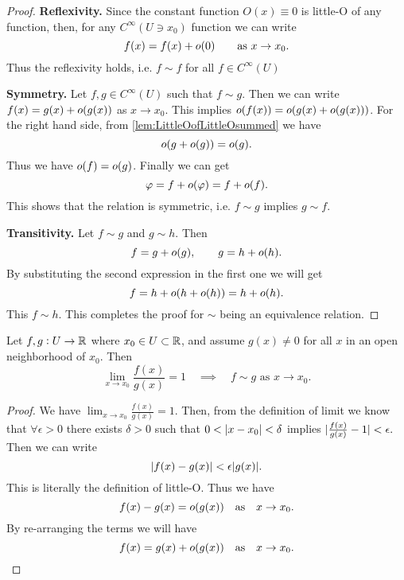 \begin{proof}
	\textbf{Reflexivity.} Since the constant function $ O(x) \equiv 0 $ is little-O of any function, then, for any $ C^\infty(U\ni x_0) $ function we can write
	\[ f(x) = f(x) + o(0) \qquad \text{as } x\to x_0. \]
	Thus the reflexivity holds, i.e. $ f \sim f $ for all $ f \in C^\infty(U) $
	
	\noindent \textbf{Symmetry.} Let $ f,g \in C^\infty(U) $ such that $ f \sim g $. Then we can write $ f(x) = g(x) + o(g(x)) $ as $ x\to x_0 $. This implies $ o(f(x)) = o(g(x) + o(g(x))) $. For the right hand side, from \autoref{lem:LittleOofLittleOsummed} we have
	\[ o(g + o(g)) = o(g). \]
	Thus we have $ o(f)  = o(g)$. Finally we can get
	\[ \varphi = f + o(\varphi) = f + o(f). \]
	This shows that the relation is symmetric, i.e. $ f \sim g $ implies $ g \sim f $.
	
	\noindent \textbf{Transitivity.} Let $ f\sim g $ and $ g \sim h $. Then 
	\[ f = g + o(g), \qquad g = h + o(h). \]
	By substituting the second expression in the first one we will get
	\[ f = h + o(h + o(h)) = h + o(h). \]
	This $ f \sim h $. This completes the proof for $ \sim $ being an equivalence relation.
\end{proof}

\begin{proposition}
	Let $ f,g: U \to \mathbb{R} $ where $ x_0 \in U \subset \mathbb{R} $, and assume $ g(x) \neq 0 $ for all $ x $ in an open neighborhood of $ x_0 $. Then 
	\[ \lim_{x \to x_0} \frac{f(x)}{g(x)} = 1 \quad \implies \quad f\sim g \text{ as } x \to x_0. \]
\end{proposition}
\begin{proof}
	We have $  \lim_{x \to x_0} \frac{f(x)}{g(x)} = 1 $. Then, from the definition of limit we know that $ \forall \epsilon>0 $ there exists $ \delta > 0 $ such that $ 0 < |x - x_0| < \delta $ implies $ |\frac{f(x)}{g(x)} - 1| < \epsilon. $ Then we can write
	\[ |f(x) - g(x)| < \epsilon |g(x)|. \]
	This is literally the definition of little-O. Thus we have
	\[  f(x) - g(x) = o(g(x)) \quad \text{as} \quad x\to x_0. \]
	By re-arranging the terms we will have
	\[ f(x) = g(x) + o(g(x)) \quad \text{as} \quad x\to x_0. \]
\end{proof}



\newpage

